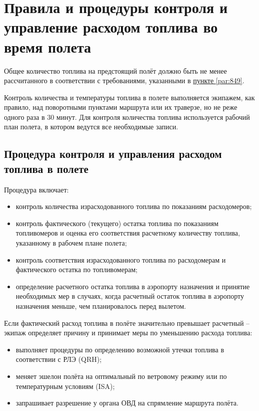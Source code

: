 \section{Правила и процедуры контроля и управление расходом топлива во время полета}

Общее количество топлива на предстоящий полёт должно быть не менее рассчитанного в соответствии с требованиями, указанными в \hyperref[par:849]{пункте \ref*{par:849}}.

Контроль количества и температуры топлива в полете выполняется экипажем, как правило, над поворотными пунктами маршрута или их траверзе, но не реже одного раза в 30 минут. Для контроля количества топлива используется рабочий план полета, в котором ведутся все необходимые записи.

\subsection{Процедура контроля и управления расходом топлива в полете}

Процедура включает:

\begin{itemize}
    \item контроль количества израсходованного топлива по показаниям расходомеров;
    \item контроль фактического (текущего) остатка топлива по показаниям топливомеров и оценка его соответствия расчетному количеству топлива, указанному в рабочем плане полета;
    \item контроль соответствия израсходованного топлива по расходомерам и фактического остатка по топливомерам;
    \item определение расчетного остатка топлива в аэропорту назначения и принятие необходимых мер в случаях, когда расчетный остаток топлива в аэропорту назначения меньше, чем планировалось перед вылетом.
\end{itemize}

Если фактический расход топлива в полёте значительно превышает расчетный – экипаж определяет причину и принимает меры по уменьшению расхода топлива:

\begin{itemize}
    \item выполняет процедуры по определению возможной утечки топлива в соответствии с РЛЭ (QRH);
    \item меняет эшелон полёта на оптимальный по ветровому режиму или по температурным условиям (ISA);
    \item запрашивает разрешение у органа ОВД на спрямление маршрута полёта.
\end{itemize}

